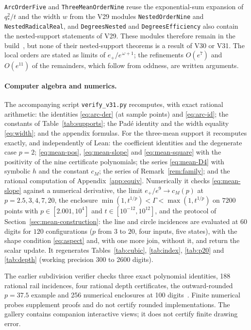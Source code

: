 \texttt{ArcOrderFive} and \texttt{ThreeMeanOrderNine} reuse the exponential-sum expansion of
$q_*^{2}/t$ and the width $w$ from the V29 modules \texttt{NestedOrderNine} and
\texttt{NestedRadicalReal}, and \texttt{DegreesNested} and \texttt{DegreesEfficiency} also contain the
nested-support statements of V29. These modules therefore remain in the build~\cite{supplNR}, but none of
their nested-support theorems is a result of V30 or V31. The local orders are stated as limits of
$e_+/e^{\,\omega+1}$; the refinements $O(e^{7})$ and $O(e^{11})$ of the remainders, which follow from
oddness, are written arguments.

\paragraph{Computer algebra and numerics.}
The accompanying script \texttt{verify\_v31.py} recomputes, with exact rational arithmetic: the
identities \eqref{eq:arc-der} (at sample points) and \eqref{eq:arc-id}; the constants of
Table~\ref{tab:supports}; the Pad\'e identity and the width equality \eqref{eq:width}; and the appendix
formulas. For the three-mean support it recomputes exactly, and independently of Lean: the coefficient
identities and the degenerate case $p=2$; \eqref{eq:mean-pos}, \eqref{eq:mean-slope} and
\eqref{eq:mean-square} with the positivity of the nine certificate polynomials; the series
\eqref{eq:mean-D4} with symbolic $h$ and the constant $c_M$; the series of Remark~\ref{rem:family}; and
the rational computation of Appendix~\ref{app:equiv}. Numerically it checks \eqref{eq:mean-slope}
against a numerical derivative, the limit $e_+/e^{9}\to c_M(p)$ at $p=2.5,3,4,7,20$, the enclosure
$\min(1,t^{1/p})<\Gamma<\max(1,t^{1/p})$ on $7200$ points with $p\in[2.001,10^{4}]$ and
$t\in[10^{-12},10^{12}]$, and the protocol of Section~\ref{sec:mean-construction}: the line and circle
incidences are evaluated at $60$ digits for $120$ configurations ($p$ from $3$ to $20$, four inputs,
five states), with the shape condition \eqref{eq:aspect} and, with one more join, without it, and
return the scalar update. It regenerates Tables~\ref{tab:cubic}, \ref{tab:index}, \ref{tab:p20} and
\ref{tab:depth} (working precision 300 to 2600 digits).

The earlier subdivision verifier checks three exact polynomial identities, 188 rational rail
incidences, four rational depth certificates, the outward-rounded $p=37.5$ example and 256 numerical
enclosures at 100 digits~\cite{supplS}. Finite numerical probes supplement proofs and do not certify
rounded implementations. The gallery contains companion interactive views; it does not certify finite
drawing error.


